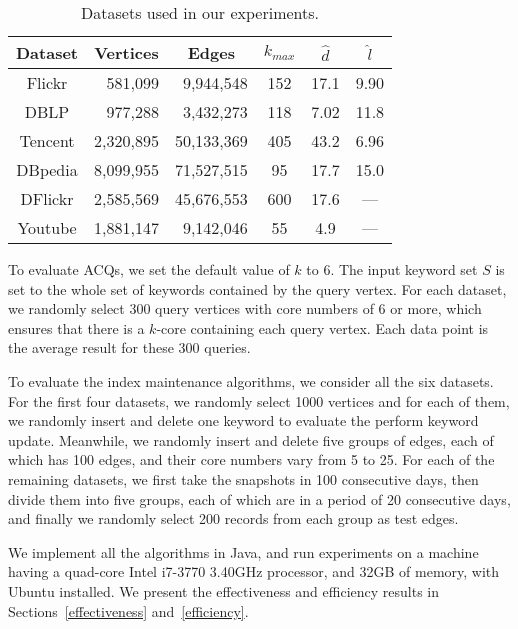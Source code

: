 \begin{table}[h]
  \centering
  \small
  \footnotesize \caption {Datasets used in our experiments.}\label{tab:dataset}
  \begin{tabular}{c|r|r|c|c|c}
     \hline
          {\bf Dataset}  & \multicolumn{1}{c|}{\textbf{Vertices}}
                         & \multicolumn{1}{c|}{\textbf{Edges}}
                         & $k_{max}$
                         & \textbf{\emph{{$\widehat d$}}}
                         & \textbf{\emph{{$\widehat l$}}}\\
     \hline\hline
          Flickr         &  581,099      &  9,944,548   &   152   & 17.1   &  9.90 \\
     \hline
          DBLP           &  977,288      &  3,432,273   &   118   &  7.02  &  11.8 \\
     \hline
          Tencent        &  2,320,895    &  50,133,369  &   405   &  43.2  &  6.96 \\
     \hline
          DBpedia        &  8,099,955    &  71,527,515  &    95   &  17.7  &  15.0 \\
     \hline
          DFlickr        &  2,585,569    &  45,676,553  &   600   &  17.6  &  --- \\
     \hline
          Youtube        &  1,881,147    &  9,142,046   &   55   &  4.9  &  --- \\
     \hline
  \end{tabular}
\end{table}

{\color{blue}
To evaluate ACQs, we set the default value of $k$ to 6. The input keyword set $S$ is set to the whole set of keywords contained by the query vertex. For each dataset, we randomly select 300 query vertices with core numbers of 6 or more, which ensures that there is a $k$-core containing each query vertex.
Each data point is the average result for these 300 queries.

To evaluate the index maintenance algorithms, we consider all the six datasets.
For the first four datasets, we randomly select 1000 vertices and for each of them, we randomly insert and delete one keyword to evaluate the perform keyword update. Meanwhile, we randomly insert and delete five groups of edges, each of which has 100 edges, and their core numbers vary from 5 to 25.
For each of the remaining datasets, we first take the snapshots in 100 consecutive days, then divide them into five groups, each of which are in a period of 20 consecutive days, and finally we randomly select 200 records from each group as test edges.

We implement all the algorithms in Java, and run experiments on a machine having a quad-core Intel i7-3770 3.40GHz processor, and 32GB of memory, with Ubuntu installed.
We present the effectiveness and efficiency results in Sections~\ref{effectiveness} and~\ref{efficiency}.
} 